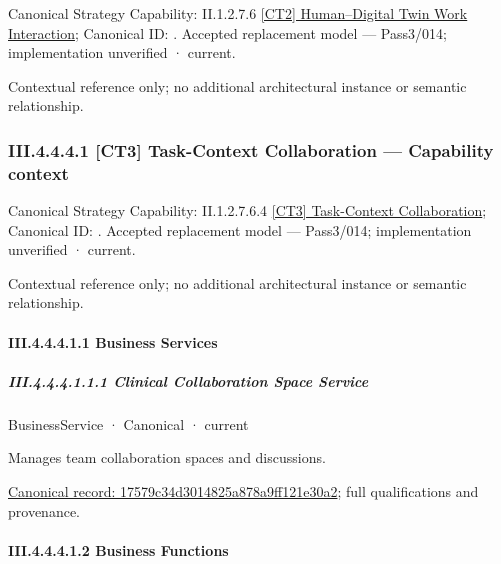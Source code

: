 {\small Canonical Strategy Capability: II.1.2.7.6 \hyperref[element:8bcaa906b67443019e75ffd13af64c9c]{[CT2] Human–Digital Twin Work Interaction}; Canonical ID: \texttt{}. Accepted replacement model — Pass3/014; implementation unverified · current.}\par
Contextual reference only; no additional architectural instance or semantic relationship.\par
\subsubsection*{III.4.4.4.1 [CT3] Task-Context Collaboration — Capability context}
\label{navigation:III.4.4.4.1}

{\small Canonical Strategy Capability: II.1.2.7.6.4 \hyperref[element:0ce2d4475d9e4fee8296f9101a6aa2af]{[CT3] Task-Context Collaboration}; Canonical ID: \texttt{}. Accepted replacement model — Pass3/014; implementation unverified · current.}\par
Contextual reference only; no additional architectural instance or semantic relationship.\par
\paragraph*{III.4.4.4.1.1 Business Services}
\label{navigation:III.4.4.4.1.1}

\subparagraph*{III.4.4.4.1.1.1 Clinical Collaboration Space Service}
\label{navigation:III.4.4.4.1.1.1}

\label{element:17579c34d3014825a878a9ff121e30a2}
{\small BusinessService · Canonical · current}\par

Manages team collaboration spaces and discussions.


{\footnotesize \href{../../../../../../../../continuum/business/business-service/17579c34d3014825a878a9ff121e30a2.md}{Canonical record: 17579c34d3014825a878a9ff121e30a2}; full qualifications and provenance.}\par
\paragraph*{III.4.4.4.1.2 Business Functions}
\label{navigation:III.4.4.4.1.2}

